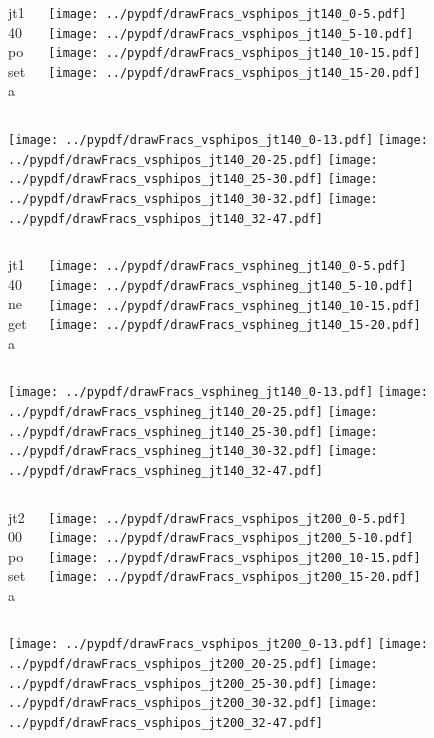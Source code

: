 \documentclass[aspectratio=169]{beamer}
\begin{document}
\begin{figure}[p]
\flushleft
\begin{columns}[T]
\begin{column}{.2\linewidth}
\centering
jt140 poseta
\end{column}
\begin{column}{.8\linewidth}
\texttt{[image: ../pypdf/drawFracs\_vsphipos\_jt140\_0-5.pdf]}
\texttt{[image: ../pypdf/drawFracs\_vsphipos\_jt140\_5-10.pdf]}
\texttt{[image: ../pypdf/drawFracs\_vsphipos\_jt140\_10-15.pdf]}
\texttt{[image: ../pypdf/drawFracs\_vsphipos\_jt140\_15-20.pdf]}
\end{column}
\end{columns}
\texttt{[image: ../pypdf/drawFracs\_vsphipos\_jt140\_0-13.pdf]}
\texttt{[image: ../pypdf/drawFracs\_vsphipos\_jt140\_20-25.pdf]}
\texttt{[image: ../pypdf/drawFracs\_vsphipos\_jt140\_25-30.pdf]}
\texttt{[image: ../pypdf/drawFracs\_vsphipos\_jt140\_30-32.pdf]}
\texttt{[image: ../pypdf/drawFracs\_vsphipos\_jt140\_32-47.pdf]}
\end{figure}

\begin{figure}[p]
\flushleft
\begin{columns}[T]
\begin{column}{.2\linewidth}
\centering
jt140 negeta
\end{column}
\begin{column}{.8\linewidth}
\texttt{[image: ../pypdf/drawFracs\_vsphineg\_jt140\_0-5.pdf]}
\texttt{[image: ../pypdf/drawFracs\_vsphineg\_jt140\_5-10.pdf]}
\texttt{[image: ../pypdf/drawFracs\_vsphineg\_jt140\_10-15.pdf]}
\texttt{[image: ../pypdf/drawFracs\_vsphineg\_jt140\_15-20.pdf]}
\end{column}
\end{columns}
\texttt{[image: ../pypdf/drawFracs\_vsphineg\_jt140\_0-13.pdf]}
\texttt{[image: ../pypdf/drawFracs\_vsphineg\_jt140\_20-25.pdf]}
\texttt{[image: ../pypdf/drawFracs\_vsphineg\_jt140\_25-30.pdf]}
\texttt{[image: ../pypdf/drawFracs\_vsphineg\_jt140\_30-32.pdf]}
\texttt{[image: ../pypdf/drawFracs\_vsphineg\_jt140\_32-47.pdf]}
\end{figure}

\begin{figure}[p]
\flushleft
\begin{columns}[T]
\begin{column}{.2\linewidth}
\centering
jt200 poseta
\end{column}
\begin{column}{.8\linewidth}
\texttt{[image: ../pypdf/drawFracs\_vsphipos\_jt200\_0-5.pdf]}
\texttt{[image: ../pypdf/drawFracs\_vsphipos\_jt200\_5-10.pdf]}
\texttt{[image: ../pypdf/drawFracs\_vsphipos\_jt200\_10-15.pdf]}
\texttt{[image: ../pypdf/drawFracs\_vsphipos\_jt200\_15-20.pdf]}
\end{column}
\end{columns}
\texttt{[image: ../pypdf/drawFracs\_vsphipos\_jt200\_0-13.pdf]}
\texttt{[image: ../pypdf/drawFracs\_vsphipos\_jt200\_20-25.pdf]}
\texttt{[image: ../pypdf/drawFracs\_vsphipos\_jt200\_25-30.pdf]}
\texttt{[image: ../pypdf/drawFracs\_vsphipos\_jt200\_30-32.pdf]}
\texttt{[image: ../pypdf/drawFracs\_vsphipos\_jt200\_32-47.pdf]}
\end{figure}
\end{document}
